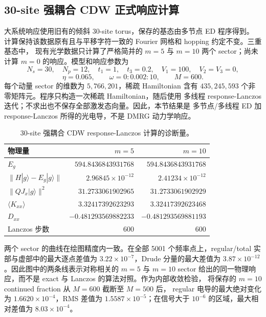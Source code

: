\documentclass[11pt]{article}
\begin{document}
\clearpage
\subsection{30-site 强耦合 CDW 正式响应计算}

大系统响应使用旧有的倾斜 30-site torus，保存的基态由多节点 ED 程序得到。
计算保持该数据原有且与平移字符一致的 Fourier 网格和 hopping 约定不变。三重基态中，
现有光学数据只计算了严格简并的 \(m=5\) 与 \(m=10\) 两个 sector；尚未计算
\(m=0\) 的响应。模型和响应参数为
\[
  N_s=30,\quad N_p=12,\quad t_1=1,\quad t_3=0.2,\quad
  V_1=100,\quad V_2=V_3=0,
\]
\[
  \eta=0.065,\qquad \omega=0:0.002:10,\qquad M=600.
\]
每个动量 sector 的维数为 \(5{,}766{,}201\)，稀疏 Hamiltonian 含有
\(435{,}245{,}593\) 个非零矩阵元。程序只构造一次稀疏 Hamiltonian，随后使用
多线程 response-Lanczos 迭代；不求出也不保存全部激发态向量。因此，本节结果是
多节点/多线程 ED 加 response-Lanczos 所得的光电导，不是 DMRG 动力学响应。

\begin{table}[H]
\centering
\small
\caption{30-site 强耦合 CDW response-Lanczos 计算的诊断量。}
\begin{tabular}{lrr}
\toprule
物理量 & \(m=5\) & \(m=10\) \\
\midrule
\(E_g\) & \(594.8436843931768\) & \(594.8436843931768\) \\
\(\lVert H|g\rangle-E_g|g\rangle\rVert\) &
\(2.96845\times10^{-12}\) & \(2.41234\times10^{-12}\) \\
\(\lVert QJ_x|g\rangle\rVert^2\) &
\(31.2733061902965\) & \(31.2733061902929\) \\
\(\langle K_{xx}\rangle\) & \(3.32417392623293\) & \(3.32417392623468\) \\
\(D_{xx}\) & \(-0.481293569882233\) & \(-0.481293569881193\) \\
Lanczos 步数 & 600 & 600 \\
\bottomrule
\end{tabular}
\end{table}

两个 sector 的曲线在绘图精度内一致。在全部 5001 个频率点上，regular/total
实部与虚部中的最大逐点差值为 \(3.22\times10^{-7}\)，Drude 分量的最大差值为
\(3.87\times10^{-12}\)。因此图中的两条线表示对称相关的 \(m=5\) 与 \(m=10\)
sector 给出的同一物理响应，而不是 exact 与 Lanczos 的算法对照。作为内部收敛检验，
将保存的 \(m=10\) continued fraction 从 \(M=600\) 截断至 \(M=500\) 后，
regular 电导的最大绝对变化为 \(1.6620\times10^{-4}\)，RMS 差值为
\(1.5587\times10^{-5}\)；在信号大于 \(10^{-6}\) 的区域，最大相对差值为
\(8.03\times10^{-4}\)。
\end{document}
